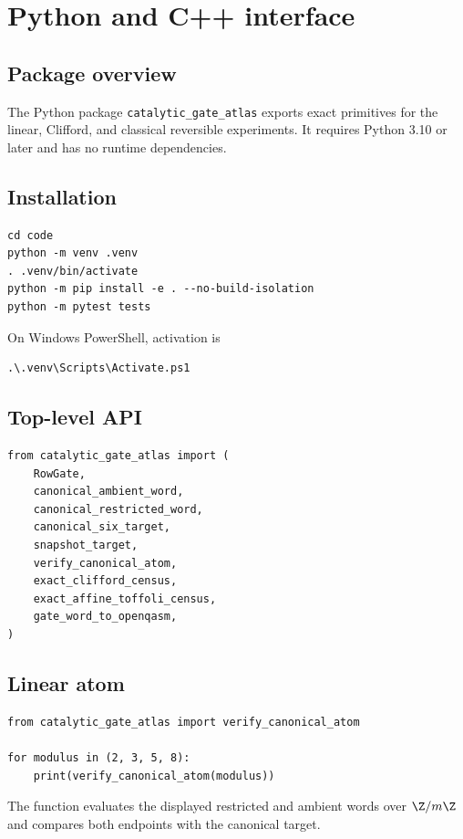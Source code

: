 \chapter{Python and C++ interface}\label{app:api}


\section{Package overview}
The Python package \texttt{catalytic\_gate\_atlas} exports exact primitives for the linear, Clifford, and classical reversible experiments.  It requires Python 3.10 or later and has no runtime dependencies.

\section{Installation}
\begin{lstlisting}[style=pythonstyle]
cd code
python -m venv .venv
. .venv/bin/activate
python -m pip install -e . --no-build-isolation
python -m pytest tests
\end{lstlisting}
On Windows PowerShell, activation is
\begin{verbatim}
.\.venv\Scripts\Activate.ps1
\end{verbatim}

\section{Top-level API}
\begin{lstlisting}[style=pythonstyle]
from catalytic_gate_atlas import (
    RowGate,
    canonical_ambient_word,
    canonical_restricted_word,
    canonical_six_target,
    snapshot_target,
    verify_canonical_atom,
    exact_clifford_census,
    exact_affine_toffoli_census,
    gate_word_to_openqasm,
)
\end{lstlisting}

\section{Linear atom}
\begin{lstlisting}[style=pythonstyle]
from catalytic_gate_atlas import verify_canonical_atom

for modulus in (2, 3, 5, 8):
    print(verify_canonical_atom(modulus))
\end{lstlisting}
The function evaluates the displayed restricted and ambient words over $\Z/m\Z$ and compares both endpoints with the canonical target.

